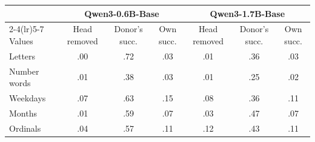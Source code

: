\begin{tabular}{lcccccc}
\toprule
 & \multicolumn{3}{c}{Qwen3-0.6B-Base} & \multicolumn{3}{c}{Qwen3-1.7B-Base} \\
\cmidrule(lr){2-4}\cmidrule(lr){5-7}
Values & Head removed & Donor's succ. & Own succ. & Head removed & Donor's succ. & Own succ. \\
\midrule
Letters & .00 & .72 & .03 & .01 & .36 & .03 \\
Number words & .01 & .38 & .03 & .01 & .25 & .02 \\
Weekdays & .07 & .63 & .15 & .08 & .36 & .11 \\
Months & .01 & .59 & .07 & .03 & .47 & .07 \\
Ordinals & .04 & .57 & .11 & .12 & .43 & .11 \\
\bottomrule
\end{tabular}
